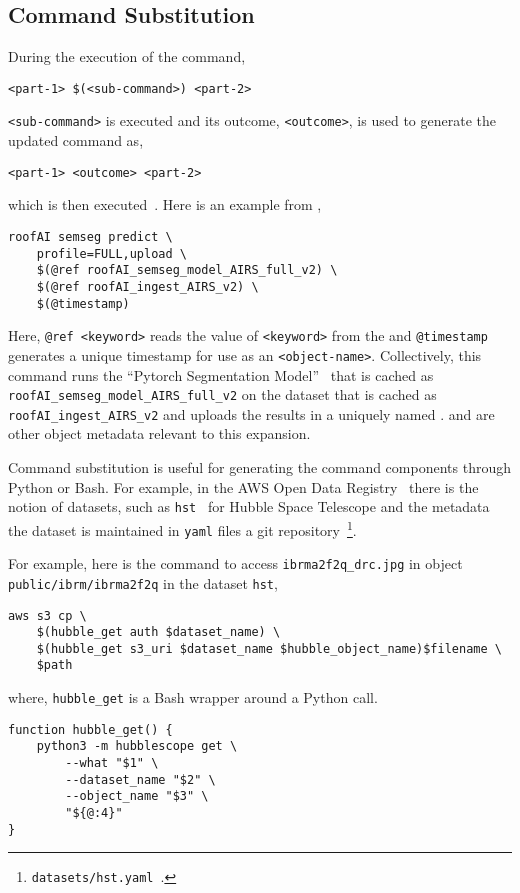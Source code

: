 \subsection{Command Substitution}\label{command_substitution}

During the execution of the command,
%
\begin{verbatim}
<part-1> $(<sub-command>) <part-2>
\end{verbatim}
%
\texttt{<sub-command>} is executed and its outcome, \texttt{<outcome>}, is used to generate the updated command as,
%
\begin{verbatim}
<part-1> <outcome> <part-2>
\end{verbatim}
%
which is then executed~\cite{command_substitution}. Here is an example from ,
%
\begin{verbatim}
roofAI semseg predict \
    profile=FULL,upload \
    $(@ref roofAI_semseg_model_AIRS_full_v2) \
    $(@ref roofAI_ingest_AIRS_v2) \
    $(@timestamp)
\end{verbatim}
%
Here, \texttt{@ref <keyword>} reads the value of \texttt{<keyword>} from the  and \texttt{@timestamp} generates a unique timestamp for use as an \texttt{<object-name>}. Collectively, this command runs the \enquote{Pytorch Segmentation Model}~\cite{smp} that is cached as \texttt{roofAI\_semseg\_model\_AIRS\_full\_v2} on the dataset that is cached as \texttt{roofAI\_ingest\_AIRS\_v2} and uploads the results in a uniquely named .  and  are other object metadata relevant to this expansion.

Command substitution is useful for generating the command components through Python or Bash. For example, in the AWS Open Data Registry~\cite{aws_open_data} there is the notion of datasets, such as \texttt{hst}~\cite{hst} for Hubble Space Telescope and the metadata the dataset is maintained in \texttt{yaml} files a git repository~\footnote{\texttt{datasets/hst.yaml}~\cite{aws_open_data}.}. 

For example, here is the command to access \texttt{ibrma2f2q\_drc.jpg} in object \texttt{public/ibrm/ibrma2f2q} in the dataset \texttt{hst},
%
\begin{verbatim}
aws s3 cp \
    $(hubble_get auth $dataset_name) \
    $(hubble_get s3_uri $dataset_name $hubble_object_name)$filename \
    $path
\end{verbatim}
%
where, \texttt{hubble\_get} is a Bash wrapper around a Python call.
%
\begin{verbatim}
function hubble_get() {
    python3 -m hubblescope get \
        --what "$1" \
        --dataset_name "$2" \
        --object_name "$3" \
        "${@:4}"
}
\end{verbatim}




